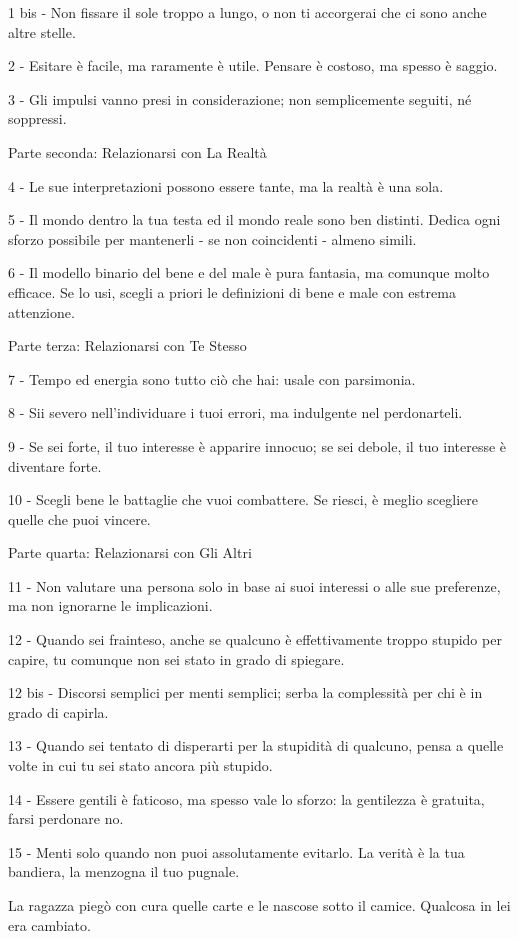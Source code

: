 1 bis - Non fissare il sole troppo a lungo, o non ti accorgerai che ci sono anche altre stelle.

2 - Esitare è facile, ma raramente è utile. Pensare è costoso, ma spesso è saggio.

3 - Gli impulsi vanno presi in considerazione; non semplicemente seguiti, né soppressi.

Parte seconda: Relazionarsi con La Realtà

4 - Le sue interpretazioni possono essere tante, ma la realtà è una sola.

5 - Il mondo dentro la tua testa ed il mondo reale sono ben distinti. Dedica ogni sforzo possibile per mantenerli - se non coincidenti - almeno simili.

6 - Il modello binario del bene e del male è pura fantasia, ma comunque molto efficace. Se lo usi, scegli a priori le definizioni di bene e male con estrema attenzione.

Parte terza: Relazionarsi con Te Stesso

7 - Tempo ed energia sono tutto ciò che hai: usale con parsimonia.

8 - Sii severo nell’individuare i tuoi errori, ma indulgente nel perdonarteli.

9 - Se sei forte, il tuo interesse è apparire innocuo; se sei debole, il tuo interesse è diventare forte.

10 - Scegli bene le battaglie che vuoi combattere. Se riesci, è meglio scegliere quelle che puoi vincere.

Parte quarta: Relazionarsi con Gli Altri

11 - Non valutare una persona solo in base ai suoi interessi o alle sue preferenze, ma non ignorarne le implicazioni.

12 - Quando sei frainteso, anche se qualcuno è effettivamente troppo stupido per capire, tu comunque non sei stato in grado di spiegare.

12 bis - Discorsi semplici per menti semplici; serba la complessità per chi è in grado di capirla.

13 - Quando sei tentato di disperarti per la stupidità di qualcuno, pensa a quelle volte in cui tu sei stato ancora più stupido.

14 - Essere gentili è faticoso, ma spesso vale lo sforzo: la gentilezza è gratuita, farsi perdonare no.

15 - Menti solo quando non puoi assolutamente evitarlo. La verità è la tua bandiera, la menzogna il tuo pugnale.

La ragazza piegò con cura quelle carte e le nascose sotto il camice. Qualcosa in lei era cambiato.
